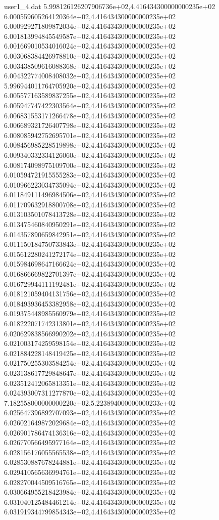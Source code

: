 \begin{filecontents}{user1_4.dat}
5.998126126207906736e+02,4.416434300000000235e+02
6.000559605264120364e+02,4.416434300000000235e+02
6.000929271809872034e+02,4.416434300000000235e+02
6.001813994845549587e+02,4.416434300000000235e+02
6.001669010534016024e+02,4.416434300000000235e+02
6.003068384426978810e+02,4.416434300000000235e+02
6.003438509616088368e+02,4.416434300000000235e+02
6.004322774008408032e+02,4.416434300000000235e+02
5.996944011764705920e+02,4.416434300000000235e+02
6.005577163589837255e+02,4.416434300000000235e+02
6.005947747422303564e+02,4.416434300000000235e+02
6.006831553171266478e+02,4.416434300000000235e+02
6.006689321726407798e+02,4.416434300000000235e+02
6.008085942752695701e+02,4.416434300000000235e+02
6.008456985228519898e+02,4.416434300000000235e+02
6.009340332334126060e+02,4.416434300000000235e+02
6.008174098975109700e+02,4.416434300000000235e+02
6.010594721915555283e+02,4.416434300000000235e+02
6.010966223034735094e+02,4.416434300000000235e+02
6.011849111496984506e+02,4.416434300000000235e+02
6.011709632918800708e+02,4.416434300000000235e+02
6.013103501078413728e+02,4.416434300000000235e+02
6.013475460840950291e+02,4.416434300000000235e+02
6.014357890659842951e+02,4.416434300000000235e+02
6.011150184750733843e+02,4.416434300000000235e+02
6.015612280241272174e+02,4.416434300000000235e+02
6.015984698647166624e+02,4.416434300000000235e+02
6.016866669822701397e+02,4.416434300000000235e+02
6.016729944111192481e+02,4.416434300000000235e+02
6.018121059404131756e+02,4.416434300000000235e+02
6.018493936453382958e+02,4.416434300000000235e+02
6.019375448985560979e+02,4.416434300000000235e+02
6.018222071742313801e+02,4.416434300000000235e+02
6.020629838566990202e+02,4.416434300000000235e+02
6.021003174259598154e+02,4.416434300000000235e+02
6.021884228148419425e+02,4.416434300000000235e+02
6.021750255303584254e+02,4.416434300000000235e+02
6.023138617729848647e+02,4.416434300000000235e+02
6.023512412065813351e+02,4.416434300000000235e+02
6.024393007311277870e+02,4.416434300000000235e+02
7.182558000000000220e+02,5.223894000000000233e+02
6.025647396892707093e+02,4.416434300000000235e+02
6.026021649872029684e+02,4.416434300000000235e+02
6.026901786474136316e+02,4.416434300000000235e+02
6.026770566495977164e+02,4.416434300000000235e+02
6.028156176055565538e+02,4.416434300000000235e+02
6.028530887678244881e+02,4.416434300000000235e+02
6.029410565636994761e+02,4.416434300000000235e+02
6.028270044509516765e+02,4.416434300000000235e+02
6.030664955218423984e+02,4.416434300000000235e+02
6.031040125484461214e+02,4.416434300000000235e+02
6.031919344799854343e+02,4.416434300000000235e+02

\end{filecontents}
